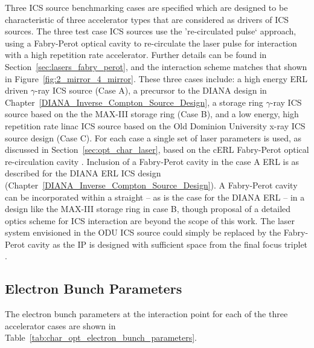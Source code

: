 \documentclass[../main.tex]{subfiles}
\begin{document}
Three ICS source benchmarking cases are specified which are designed to be characteristic of three accelerator types that are considered as drivers of ICS sources. The three test case ICS sources use the 're-circulated pulse` approach, using a Fabry-Perot optical cavity to re-circulate the laser pulse for interaction with a high repetition rate accelerator. Further details can be found in Section~\ref{sec:lasers_fabry_perot}, and the interaction scheme matches that shown in Figure~\ref{fig:2_mirror_4_mirror}. These three cases include: a high energy ERL driven $\gamma$-ray ICS source (Case A), a precursor to the DIANA design in Chapter~\ref{DIANA_Inverse_Compton_Source_Design}, a storage ring $\gamma$-ray ICS source based on the the MAX-III storage ring  \cite{owen2013nonequilibrium,sjostrom2009max} (Case B), and a low energy, high repetition rate linac ICS source based on the Old Dominion University x-ray ICS source design \cite{krafft2016laser,deitrick2017inverse,deitrick2018high} (Case C). For each case a single set of laser parameters is used, as discussed in Section~\ref{sec:opt_char_laser}, based on the cERL Fabry-Perot optical re-circulation cavity \cite{akagi2016narrow}. Inclusion of a Fabry-Perot cavity in the case A ERL is as described for the DIANA ERL ICS design (Chapter~\ref{DIANA_Inverse_Compton_Source_Design}). A Fabry-Perot cavity can be incorporated within a straight -- as is the case for the DIANA ERL -- in a design like the MAX-III storage ring in case B, though proposal of a detailed optics scheme for ICS interaction are beyond the scope of this work. The laser system envisioned in the ODU ICS source \cite{krafft2016laser,deitrick2017inverse,deitrick2018high} could simply be replaced by the Fabry-Perot cavity as the IP is designed with sufficient space from the final focus triplet \cite{deitrick2018high}.

\subsection{Electron Bunch Parameters}

The electron bunch parameters at the interaction point for each of the three accelerator cases are shown in Table~\ref{tab:char_opt_electron_bunch_parameters}.
\end{document}
